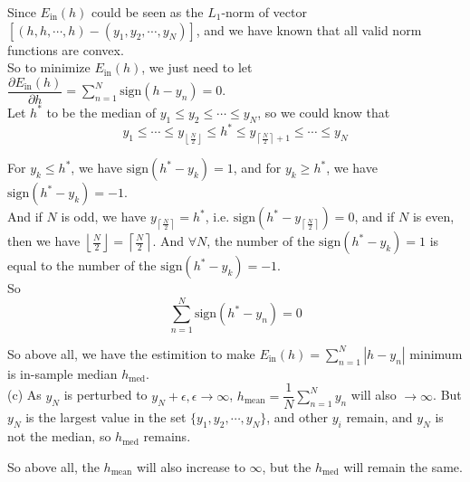 \documentclass[10pt]{article}
\begin{document}
Since $E_{\text{in}}(h)$ could be seen as the $L_1$-norm of vector $[(h,h,\cdots,h)-(y_1,y_2,\cdots,y_N)]$, and we have known that all valid norm functions are convex.\\
So to minimize $E_{\text{in}}(h)$, we just need to let $\dfrac{\partial{E}_{\text{in}}(h)}{\partial h}=\sum\limits_{n=1}^N \text{sign}(h-y_n)=0$.\\

Let $h^*$ to be the median of $y_1\leq y_2\leq\cdots\leq y_N$, so we could know that
$$y_1\leq\cdots\leq y_{\left\lfloor \frac{N}{2} \right\rfloor}\leq h^*\leq y_{\left\lceil \frac{N}{2} \right\rceil+1}\leq\cdots\leq y_N$$

For $y_k\leq h^*$, we have $\text{sign}(h^*-y_k)=1$, and for $y_k\geq h^*$, we have $\text{sign}(h^*-y_k)=-1$.\\
And if $N$ is odd, we have $y_{\left\lceil \frac{N}{2} \right\rceil}=h^*$, i.e. $\text{sign}(h^*-y_{\left\lceil \frac{N}{2} \right\rceil})=0$, 
and if $N$ is even, then we have $\left\lfloor \frac{N}{2} \right\rfloor=\left\lceil \frac{N}{2} \right\rceil$.
And $\forall N$, the number of the $\text{sign}(h^*-y_k)=1$ is equal to the number of the $\text{sign}(h^*-y_k)=-1$.\\
So $$\sum\limits_{n=1}^N \text{sign}(h^*-y_n)=0$$

So above all, we have the estimition to make $E_{\text{in}}(h)=\sum\limits_{n=1}^N |h-y_n|$ minimum is in-sample median $h_{\text{med}}$.\\


(c) As $y_N$ is perturbed to $y_N+\epsilon, \epsilon\to\infty$, $h_{\text{mean}}=\dfrac{1}{N}\sum\limits_{n=1}^Ny_n$ will also $\to\infty$.
But $y_N$ is the largest value in the set $\{y_1,y_2,\cdots,y_N\}$, and other $y_i$ remain, and $y_N$ is not the median, so $h_{\text{med}}$ remains.

So above all, the $h_{\text{mean}}$ will also increase to $\infty$, but the $h_{\text{med}}$ will remain the same.\\


\newpage
\end{document}
